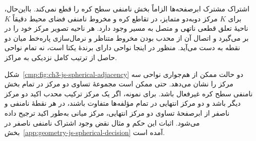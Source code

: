 اشتراک مشترک ابرصفحه‌ها الزاماً بخش نامنفی سطح
کره را قطع نمی‌کند. بااین‌حال، برای $K$ مرکز
دوبه‌دو متمایز، در تقاطع کره و مخروط نامنفی
فضای محیط دقیقاً $K$ ناحیهٔ تعلق قطعی ناتهی
و متصل به مسیر وجود دارد. هر ناحیه تصویر مرکز
خود را در بر می‌گیرد و اتصال آن از محدب بودن
مخروط متناظر و نرمال‌سازی پاره‌خط میان دو نقطه
به دست می‌آید. منظور در اینجا نواحی دارای
برندهٔ یکتا است، نه تمام نواحی حاصل از ترتیب
کامل نزدیکی به مراکز.

شکل~\ref{cmp:fig:ch3-js-spherical-adjacency}
دو حالت ممکن از هم‌جواری نواحی سه مرکز را
نشان می‌دهد. حتی ممکن است مجموعهٔ تساوی
دو مرکز در تمام بخش نامنفی سطح کره غیرفعال
باشد. برای نمونه، اگر یک مرکز ترکیب محدب
اکید دو مرکز دیگر باشد و دو مرکز انتهایی در
تمام مؤلفه‌ها متفاوت باشند، در هر نقطهٔ
نامنفی و ناصفر از ابرصفحهٔ تساوی دو مرکز
انتهایی، مرکز میانی به‌طور اکید ترجیح داده
می‌شود. اثبات این حکم و مثال نقض وجود اشتراک
نامنفی ناصفر در بخش~\ref{app:geometry-js-spherical-decision}
آمده است.

